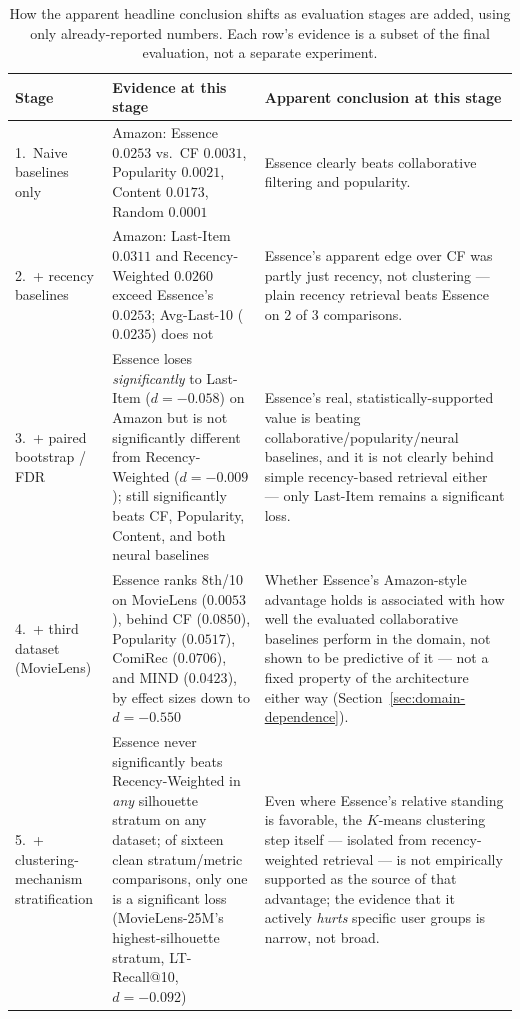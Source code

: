 \documentclass[11pt,a4paper]{article}
\begin{document}
\begin{table}[htbp]
\centering
\caption{How the apparent headline conclusion shifts as evaluation stages
         are added, using only already-reported numbers. Each row's
         evidence is a subset of the final evaluation, not a separate
         experiment.}
\label{tab:claim-reversal}
\small
\begin{tabular}{p{2.5cm}p{4.7cm}p{6.3cm}}
\toprule
\textbf{Stage} & \textbf{Evidence at this stage} & \textbf{Apparent conclusion at this stage} \\
\midrule
1.\ Naive baselines only & Amazon: Essence $0.0253$ vs.\ CF $0.0031$, Popularity $0.0021$, Content $0.0173$, Random $0.0001$ & Essence clearly beats collaborative filtering and popularity. \\
\midrule
2.\ + recency baselines & Amazon: Last-Item $0.0311$ and Recency-Weighted $0.0260$ exceed Essence's $0.0253$; Avg-Last-10 ($0.0235$) does not & Essence's apparent edge over CF was partly just recency, not clustering --- plain recency retrieval beats Essence on 2 of 3 comparisons. \\
\midrule
3.\ + paired bootstrap / FDR & Essence loses \emph{significantly} to Last-Item ($d=-0.058$) on Amazon but is not significantly different from Recency-Weighted ($d=-0.009$); still significantly beats CF, Popularity, Content, and both neural baselines & Essence's real, statistically-supported value is beating collaborative/popularity/neural baselines, and it is not clearly behind simple recency-based retrieval either --- only Last-Item remains a significant loss. \\
\midrule
4.\ + third dataset (MovieLens) & Essence ranks 8th/10 on MovieLens ($0.0053$), behind CF ($0.0850$), Popularity ($0.0517$), ComiRec ($0.0706$), and MIND ($0.0423$), by effect sizes down to $d=-0.550$ & Whether Essence's Amazon-style advantage holds is associated with how well the evaluated collaborative baselines perform in the domain, not shown to be predictive of it --- not a fixed property of the architecture either way (Section~\ref{sec:domain-dependence}). \\
\midrule
5.\ + clustering-mechanism stratification & Essence never significantly beats Recency-Weighted in \emph{any} silhouette stratum on any dataset; of sixteen clean stratum/metric comparisons, only one is a significant loss (MovieLens-25M's highest-silhouette stratum, LT-Recall@10, $d=-0.092$) & Even where Essence's relative standing is favorable, the $K$-means clustering step itself --- isolated from recency-weighted retrieval --- is not empirically supported as the source of that advantage; the evidence that it actively \emph{hurts} specific user groups is narrow, not broad. \\

\end{tabular}
\end{table}
\end{document}
